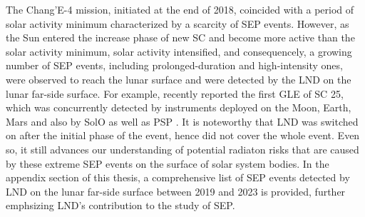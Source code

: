 


The Chang'E-4 mission, initiated at the end of 2018, coincided with a period of solar activity minimum characterized by a scarcity of \ac{SEP} events. However, as the Sun entered the increase phase of new \ac{SC} and become more active than the solar activity minimum, solar activity intensified, and consequencely, a growing number of \ac{SEP} events, including prolonged-duration and high-intensity ones, were observed to reach the lunar surface and were detected by the \ac{LND} on the lunar far-side surface. For example, \citet{Guo2023GRL} recently reported the first \ac{GLE} of \ac{SC} 25, which was concurrently detected by instruments deployed on the Moon, Earth, Mars and also by \ac{SolO} as well as \ac{PSP} \citep{Papaioannou2022AA, Martucci2023SpWea, Chertok2022MNRAS}. It is noteworthy that \ac{LND} was switched on after the initial phase of the event, hence did not cover the whole event. Even so, it still advances our understanding of potential radiaton risks that are caused by these extreme \ac{SEP} events on the surface of solar system bodies.
In the appendix section of this thesis, a comprehensive list of \ac{SEP} events detected by \ac{LND} on the lunar far-side surface between 2019 and 2023 is provided, further emphsizing \ac{LND}'s contribution to the study of \acs{SEP}.


